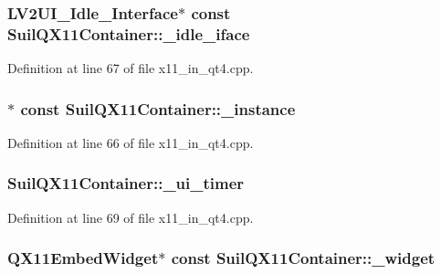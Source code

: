 \subsubsection[{\texorpdfstring{\+\_\+idle\+\_\+iface}{_idle_iface}}]{ {\bf L\+V2\+U\+I\+\_\+\+Idle\+\_\+\+Interface}$\ast$ {\bf const} Suil\+Q\+X11\+Container\+::\+\_\+idle\+\_\+iface}\hypertarget{class_suil_q_x11_container_af4e0f4288de32cfba1cda0c9d0092d7a}{}\label{class_suil_q_x11_container_af4e0f4288de32cfba1cda0c9d0092d7a}


Definition at line 67 of file x11\+\_\+in\+\_\+qt4.\+cpp.

\subsubsection[{\texorpdfstring{\+\_\+instance}{_instance}}]{$\ast$ {\bf const} Suil\+Q\+X11\+Container\+::\+\_\+instance}\hypertarget{class_suil_q_x11_container_af352fbcf9dd9d8d85309ef4cb28f3ba7}{}\label{class_suil_q_x11_container_af352fbcf9dd9d8d85309ef4cb28f3ba7}


Definition at line 66 of file x11\+\_\+in\+\_\+qt4.\+cpp.

\subsubsection[{\texorpdfstring{\+\_\+ui\+\_\+timer}{_ui_timer}}]{ Suil\+Q\+X11\+Container\+::\+\_\+ui\+\_\+timer}\hypertarget{class_suil_q_x11_container_abb99c31ab2dba1ec9eea3ef48ca7a9e0}{}\label{class_suil_q_x11_container_abb99c31ab2dba1ec9eea3ef48ca7a9e0}


Definition at line 69 of file x11\+\_\+in\+\_\+qt4.\+cpp.

\subsubsection[{\texorpdfstring{\+\_\+widget}{_widget}}]{\setlength{\rightskip}{0pt plus 5cm}Q\+X11\+Embed\+Widget$\ast$ {\bf const} Suil\+Q\+X11\+Container\+::\+\_\+widget}\hypertarget{class_suil_q_x11_container_a45a6b3c136256dbd163ad5c148db908c}{}\label{class_suil_q_x11_container_a45a6b3c136256dbd163ad5c148db908c}


